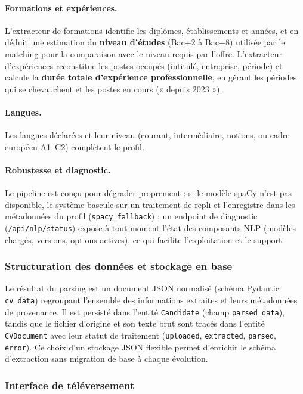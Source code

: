 \documentclass[12pt,a4paper]{report}
\begin{document}
\paragraph{Formations et expériences.} L'extracteur de formations identifie les diplômes, établissements et années, et en déduit une estimation du \textbf{niveau d'études} (Bac+2 à Bac+8) utilisée par le matching pour la comparaison avec le niveau requis par l'offre. L'extracteur d'expériences reconstitue les postes occupés (intitulé, entreprise, période) et calcule la \textbf{durée totale d'expérience professionnelle}, en gérant les périodes qui se chevauchent et les postes en cours (« depuis 2023 »).

\paragraph{Langues.} Les langues déclarées et leur niveau (courant, intermédiaire, notions, ou cadre européen A1--C2) complètent le profil.

\paragraph{Robustesse et diagnostic.} Le pipeline est conçu pour dégrader proprement : si le modèle spaCy n'est pas disponible, le système bascule sur un traitement de repli et l'enregistre dans les métadonnées du profil (\texttt{spacy\_fallback}) ; un endpoint de diagnostic (\texttt{/api/nlp/status}) expose à tout moment l'état des composants NLP (modèles chargés, versions, options actives), ce qui facilite l'exploitation et le support.

\subsubsection{Structuration des données et stockage en base}

Le résultat du parsing est un document JSON normalisé (schéma Pydantic \texttt{cv\_data}) regroupant l'ensemble des informations extraites et leurs métadonnées de provenance. Il est persisté dans l'entité \texttt{Candidate} (champ \texttt{parsed\_data}), tandis que le fichier d'origine et son texte brut sont tracés dans l'entité \texttt{CVDocument} avec leur statut de traitement (\texttt{uploaded}, \texttt{extracted}, \texttt{parsed}, \texttt{error}). Ce choix d'un stockage JSON flexible permet d'enrichir le schéma d'extraction sans migration de base à chaque évolution.

\subsubsection{Interface de téléversement}
\end{document}
